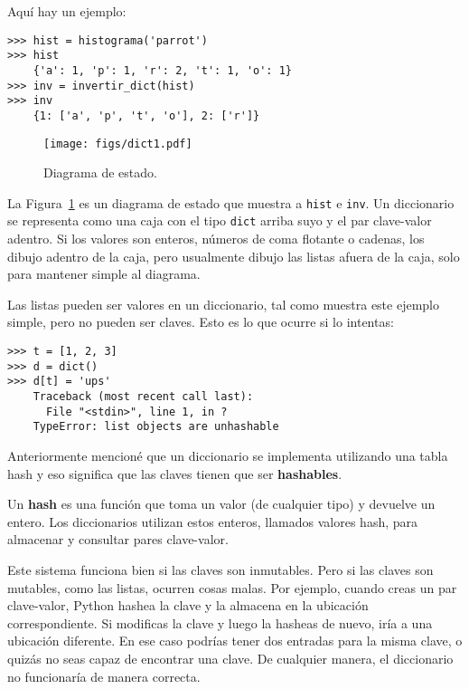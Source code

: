 \documentclass[10pt]{book}
\begin{document}
Aquí hay un ejemplo:

\begin{verbatim}
>>> hist = histograma('parrot')
>>> hist
    {'a': 1, 'p': 1, 'r': 2, 't': 1, 'o': 1}
>>> inv = invertir_dict(hist)
>>> inv
    {1: ['a', 'p', 't', 'o'], 2: ['r']}
\end{verbatim}

\begin{figure}
\centerline
{\texttt{[image: figs/dict1.pdf]}}
\caption{Diagrama de estado.}
\label{fig.dict1}
\end{figure}

La Figura~\ref{fig.dict1} es un diagrama de estado que muestra a {\tt hist} e {\tt inv}.
Un diccionario se representa como una caja con el tipo {\tt dict} arriba suyo
y el par clave-valor adentro.  Si los valores son enteros, números de coma flotante o
cadenas, los dibujo adentro de la caja, pero usualmente dibujo las listas
afuera de la caja, solo para mantener simple al diagrama.

Las listas pueden ser valores en un diccionario, tal como muestra este ejemplo simple, pero
no pueden ser claves.  Esto es lo que ocurre si lo intentas:


\begin{verbatim}
>>> t = [1, 2, 3]
>>> d = dict()
>>> d[t] = 'ups'
    Traceback (most recent call last):
      File "<stdin>", line 1, in ?
    TypeError: list objects are unhashable
\end{verbatim}
%
Anteriormente mencioné que un diccionario se implementa utilizando
una tabla hash y eso significa que las claves tienen que ser {\bf hashables}.

Un {\bf hash} es una función que toma un valor (de cualquier tipo)
y devuelve un entero.  Los diccionarios utilizan estos enteros,
llamados valores hash, para almacenar y consultar pares clave-valor.

Este sistema funciona bien si las claves son inmutables.  Pero si las
claves son mutables, como las listas, ocurren cosas malas.  Por ejemplo,
cuando creas un par clave-valor, Python hashea la clave y
la almacena en la ubicación correspondiente.  Si modificas la
clave y luego la hasheas de nuevo, iría a una ubicación diferente.
En ese caso podrías tener dos entradas para la misma clave,
o quizás no seas capaz de encontrar una clave.  De cualquier manera, el
diccionario no funcionaría de manera correcta.
\end{document}
